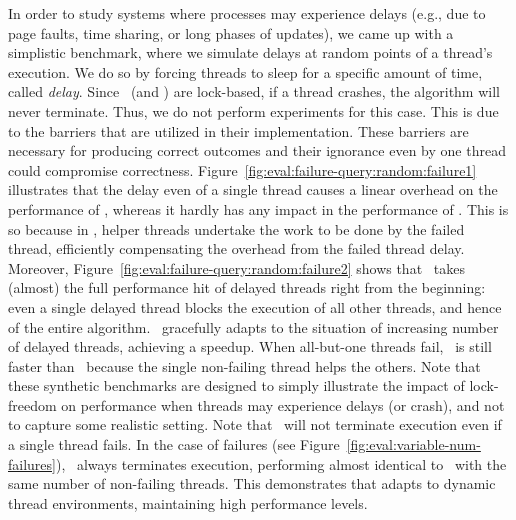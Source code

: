 In order to study systems where processes may experience delays (e.g., due to page faults,
time sharing, or long phases of updates),
we came up with a simplistic benchmark, where we simulate delays at random points of a thread's execution. 
We do so by forcing threads to sleep for a specific amount of time, called {\em delay}.
Since \MESSI\ (and \MESSIenh) are lock-based, if a thread crashes, 
the algorithm will never terminate. Thus, we do not perform experiments for this case. 
This is due to the barriers that are utilized in their implementation.
These barriers are necessary for producing correct outcomes and their ignorance even by one thread
could compromise correctness. 
%
Figure~\ref{fig:eval:failure-query:random:failure1} illustrates 
that the delay even of a single thread causes a linear overhead on the performance of \MESSI, 
whereas it hardly has any impact in the performance of \Fresh.
This is so because in \Fresh, helper threads undertake the work to be done by the failed thread,
efficiently compensating the overhead from the failed thread delay.  
Moreover, Figure~\ref{fig:eval:failure-query:random:failure2}
shows that \MESSI\ takes (almost) the full performance hit of delayed threads right from the beginning:
even a single delayed thread blocks 
the execution of all other threads, and hence of the entire algorithm.
\Fresh\ gracefully adapts to the situation of increasing number of delayed threads, 
achieving a speedup. %
When all-but-one threads fail, \Fresh\ is still faster than \MESSI\ because 
the single non-failing thread helps the others.
%
Note that these synthetic benchmarks are designed to simply illustrate the impact of lock-freedom 
on performance when threads may experience delays (or crash),
and not to capture some realistic setting. %
Note that \MESSI\ will not terminate execution even if a single thread fails. 
In the case of failures (see Figure~\ref{fig:eval:variable-num-failures}),
\Fresh\ always terminates execution, performing almost identical to \MESSI\ 
with the same number of non-failing threads. This demonstrates that \Fresh adapts
to dynamic thread environments, maintaining high performance levels.



